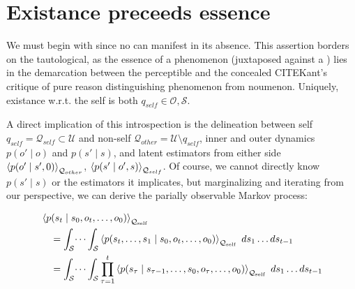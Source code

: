 \section{Existance preceeds essence}

We must begin with  since no  can manifest in its absence. This assertion borders on the tautological, as the essence of a phenomenon (juxtaposed against a ) lies in the demarcation between the perceptible and the concealed CITE{Kant's critique of pure reason distinguishing phenomenon from noumenon}. Uniquely, existance w.r.t. the self is both $q_{self} \in \mathcal{O}, \mathcal{S}$.

A direct implication of this introspection is the delineation between self $q_{self} = \mathcal{Q}_{self} \subset \mathcal{U}$ and non-self $\mathcal{Q}_{other} = \mathcal{U} \setminus q_{self}$, inner and outer dynamics $p(o' \mid o)$ and $p(s' \mid s)$, and latent estimators from either side $\left\langle p(o' \mid s', 0) \right\rangle_{\substack{\mathcal{Q}_{other}}}$, $\left\langle p(s' \mid o', s) \right\rangle_{\substack{\mathcal{Q}_{self}}}$. Of course, we cannot directly know $p(s' \mid s)$ or the estimators it implicates, but marginalizing and iterating from our perspective, we can derive the parially observable Markov process:

\[
\begin{aligned}
    &\left\langle p(s_t \mid s_0, o_t, \dots, o_0) \right\rangle_{\substack{\mathcal{Q}_{\text{self}}}} \\
    &\quad = \int_{\mathcal{S}} \dots \int_{\mathcal{S}} 
        \left\langle p(s_t, \dots, s_1 \mid s_0, o_t, \dots, o_0) \right\rangle_{\substack{\mathcal{Q}_{\text{self}}}} \
        ds_1 \dots ds_{t-1} \\
    &\quad = \int_{\mathcal{S}} \dots \int_{\mathcal{S}} 
        \prod_{\tau=1}^{t} 
            \left\langle p(s_{\tau} \mid s_{\tau-1}, \dots, s_0, o_{\tau}, \dots, o_0) \right\rangle_{\substack{\mathcal{Q}_{\text{self}}}} \
            ds_1 \dots ds_{t-1}
\end{aligned} 
\]

